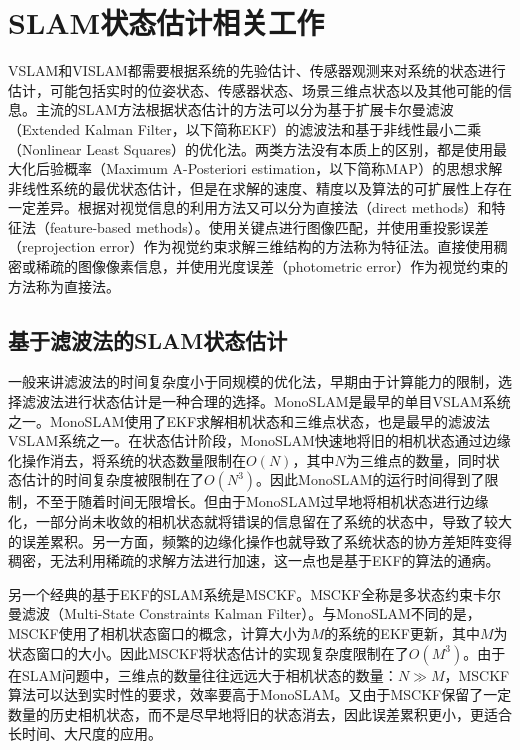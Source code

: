 \section{SLAM状态估计相关工作}

VSLAM和VISLAM都需要根据系统的先验估计、传感器观测来对系统的状态进行估计，可能包括实时的位姿状态、传感器状态、场景三维点状态以及其他可能的信息。主流的SLAM方法根据状态估计的方法可以分为基于扩展卡尔曼滤波（Extended Kalman Filter，以下简称EKF）的滤波法和基于非线性最小二乘（Nonlinear Least Squares）的优化法。两类方法没有本质上的区别，都是使用最大化后验概率（Maximum A-Posteriori estimation，以下简称MAP）的思想求解非线性系统的最优状态估计，但是在求解的速度、精度以及算法的可扩展性上存在一定差异。根据对视觉信息的利用方法又可以分为直接法（direct methods）和特征法（feature-based methods）。使用关键点进行图像匹配，并使用重投影误差（reprojection error）作为视觉约束求解三维结构的方法称为特征法。直接使用稠密或稀疏的图像像素信息，并使用光度误差（photometric error）作为视觉约束的方法称为直接法。

\subsection{基于滤波法的SLAM状态估计}

一般来讲滤波法的时间复杂度小于同规模的优化法，早期由于计算能力的限制，选择滤波法进行状态估计是一种合理的选择。MonoSLAM\citep{davison2007monoslam}是最早的单目VSLAM系统之一。MonoSLAM使用了EKF求解相机状态和三维点状态，也是最早的滤波法VSLAM系统之一。在状态估计阶段，MonoSLAM快速地将旧的相机状态通过边缘化操作消去，将系统的状态数量限制在$O(N)$，其中$N$为三维点的数量，同时状态估计的时间复杂度被限制在了$O(N^3)$。因此MonoSLAM的运行时间得到了限制，不至于随着时间无限增长。但由于MonoSLAM过早地将相机状态进行边缘化，一部分尚未收敛的相机状态就将错误的信息留在了系统的状态中，导致了较大的误差累积。另一方面，频繁的边缘化操作也就导致了系统状态的协方差矩阵变得稠密，无法利用稀疏的求解方法进行加速，这一点也是基于EKF的算法的通病。

另一个经典的基于EKF的SLAM系统是MSCKF\citep{mourikis2007multi}。MSCKF全称是多状态约束卡尔曼滤波（Multi-State Constraints Kalman Filter）。与MonoSLAM不同的是，MSCKF使用了相机状态窗口的概念，计算大小为$M$的系统的EKF更新，其中$M$为状态窗口的大小。因此MSCKF将状态估计的实现复杂度限制在了$O(M^3)$。由于在SLAM问题中，三维点的数量往往远远大于相机状态的数量：$N \gg M$，MSCKF算法可以达到实时性的要求，效率要高于MonoSLAM。又由于MSCKF保留了一定数量的历史相机状态，而不是尽早地将旧的状态消去，因此误差累积更小，更适合长时间、大尺度的应用。


